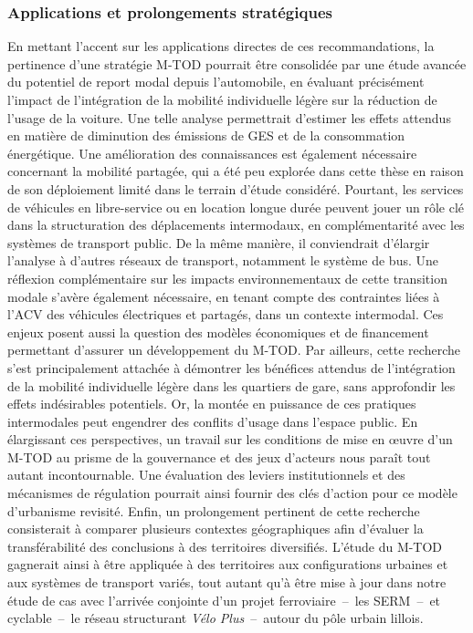 \begin{refsegment}
\subsubsection*{Applications et prolongements stratégiques
    \label{conclusion-generale:perspectives-prolongements}
    }

En mettant l'accent sur les applications directes de ces recommandations, la pertinence d'une stratégie \acrshort{M-TOD} pourrait être consolidée par une étude avancée du potentiel de report modal depuis l’automobile, en évaluant précisément l’impact de l’intégration de la mobilité individuelle légère sur la réduction de l’usage de la voiture. Une telle analyse permettrait d’estimer les effets attendus en matière de diminution des émissions de \acrfull{GES} et de la consommation énergétique. Une amélioration des connaissances est également nécessaire concernant la mobilité partagée, qui a été peu explorée dans cette thèse en raison de son déploiement limité dans le terrain d’étude considéré. Pourtant, les services de véhicules en libre-service ou en location longue durée peuvent jouer un rôle clé dans la structuration des déplacements intermodaux, en complémentarité avec les systèmes de transport public. De la même manière, il conviendrait d’élargir l’analyse à d’autres réseaux de transport, notamment le système de bus. Une réflexion complémentaire sur les impacts environnementaux de cette transition modale s’avère également nécessaire, en tenant compte des contraintes liées à l'\acrfull{ACV} des véhicules électriques et partagés, dans un contexte intermodal. Ces enjeux posent aussi la question des modèles économiques et de financement permettant d’assurer un développement du \acrshort{M-TOD}. Par ailleurs, cette recherche s’est principalement attachée à démontrer les bénéfices attendus de l’intégration de la mobilité individuelle légère dans les quartiers de gare, sans approfondir les effets indésirables potentiels. Or, la montée en puissance de ces pratiques intermodales peut engendrer des conflits d’usage dans l’espace public. En élargissant ces perspectives, un travail sur les conditions de mise en œuvre d’un \acrshort{M-TOD} au prisme de la gouvernance et des jeux d’acteurs nous paraît tout autant incontournable. Une évaluation des leviers institutionnels et des mécanismes de régulation pourrait ainsi fournir des clés d’action pour ce modèle d'urbanisme revisité. Enfin, un prolongement pertinent de cette recherche consisterait à comparer plusieurs contextes géographiques afin d’évaluer la transférabilité des conclusions à des territoires diversifiés. L’étude du \acrshort{M-TOD} gagnerait ainsi à être appliquée à des territoires aux configurations urbaines et aux systèmes de transport variés, tout autant qu’à être mise à jour dans notre étude de cas avec l’arrivée conjointe d’un projet ferroviaire~–~les \acrfull{SERM}~–~et cyclable~–~le réseau structurant \textsl{Vélo Plus}~–~autour du pôle urbain lillois.%


\end{refsegment}
